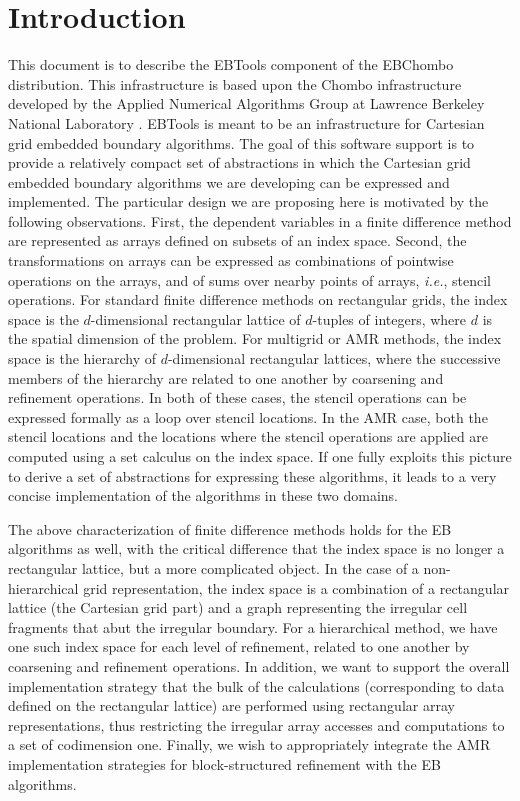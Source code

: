
\section{Introduction}

This document is to describe the EBTools component of the
EBChombo distribution.  This infrastructure is based  
upon the Chombo infrastructure developed by the Applied Numerical
Algorithms Group at Lawrence Berkeley National Laboratory
\cite{ChomboDesign}. 
EBTools is meant to be an infrastructure for Cartesian 
grid embedded boundary algorithms. 
The goal of this software support is to provide a relatively compact set
of abstractions in which the Cartesian grid embedded boundary algorithms 
we are developing can be expressed and implemented. The particular design we 
are proposing here is motivated by the following observations. First, the
dependent variables in a finite difference method are represented as 
arrays defined on subsets of an index space. Second, the transformations
on arrays can be expressed as combinations of pointwise operations on the
arrays, and of sums over nearby points of arrays, {\it i.e.}, stencil
operations. For standard finite difference methods on rectangular grids, 
the index space is the $d$-dimensional rectangular lattice of $d$-tuples of
integers, where $d$ is the spatial dimension of the problem. For multigrid
or AMR methods, the index space is the hierarchy of $d$-dimensional rectangular
lattices, where the successive members of the hierarchy are related to
one another by coarsening and refinement operations. In both of these
cases, the stencil operations can be expressed formally as a loop over
stencil locations. In the AMR case, both the stencil locations and the
locations where the stencil operations are applied are computed using a
set calculus on the index space. If one fully exploits this picture to
derive a set of abstractions for expressing these algorithms, it leads
to a very concise implementation of the algorithms in these two domains.

The above characterization of finite difference methods holds for the EB
algorithms as well, with the critical difference that the index space is
no longer a rectangular lattice, but a more complicated
object. In the case of a non-hierarchical grid representation, the index
space is a combination of a rectangular lattice (the Cartesian grid part) 
and a graph representing the irregular cell fragments that abut the 
irregular boundary. For a hierarchical method, we have one such index
space for each level of refinement, related to one another by 
coarsening and refinement operations. In addition, we want to support
the overall implementation strategy that the bulk of the 
calculations (corresponding to data defined on the rectangular lattice)
are performed using rectangular array representations, thus restricting
the irregular array accesses and computations to a set of codimension one.
Finally, we wish to appropriately integrate the AMR implementation
strategies for block-structured refinement with the EB algorithms. 

